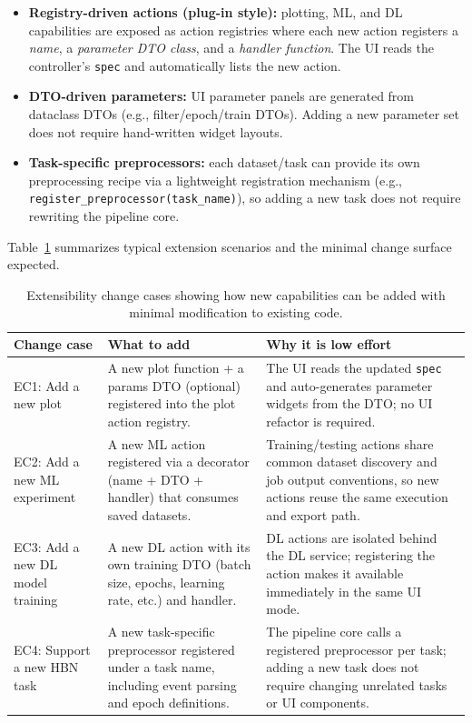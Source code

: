 \begin{itemize}[leftmargin=*]
    \item \textbf{Registry-driven actions (plug-in style):} plotting, ML, and DL capabilities are exposed as action registries where each new action registers a \textit{name}, a \textit{parameter DTO class}, and a \textit{handler function}. The UI reads the controller’s \texttt{spec} and automatically lists the new action.
    \item \textbf{DTO-driven parameters:} UI parameter panels are generated from dataclass DTOs (e.g., filter/epoch/train DTOs). Adding a new parameter set does not require hand-written widget layouts.
    \item \textbf{Task-specific preprocessors:} each dataset/task can provide its own preprocessing recipe via a lightweight registration mechanism (e.g., \texttt{register\_preprocessor(task\_name)}), so adding a new task does not require rewriting the pipeline core.
\end{itemize}

Table~\ref{tab:ext-change-cases} summarizes typical extension scenarios and the minimal change surface expected.

\begin{table}[H]
\centering
\small
\renewcommand{\arraystretch}{1.2}
\begin{tabularx}{\textwidth}{|p{}|X|X|}
\hline
\textbf{Change case} & \textbf{What to add} & \textbf{Why it is low effort} \\
\hline
EC1: Add a new plot & A new plot function + a params DTO (optional) registered into the plot action registry. & The UI reads the updated \texttt{spec} and auto-generates parameter widgets from the DTO; no UI refactor is required. \\
\hline
EC2: Add a new ML experiment & A new ML action registered via a decorator (name + DTO + handler) that consumes saved datasets. & Training/testing actions share common dataset discovery and job output conventions, so new actions reuse the same execution and export path. \\
\hline
EC3: Add a new DL model training & A new DL action with its own training DTO (batch size, epochs, learning rate, etc.) and handler. & DL actions are isolated behind the DL service; registering the action makes it available immediately in the same UI mode. \\
\hline
EC4: Support a new HBN task & A new task-specific preprocessor registered under a task name, including event parsing and epoch definitions. & The pipeline core calls a registered preprocessor per task; adding a new task does not require changing unrelated tasks or UI components. \\
\hline
\end{tabularx}
\caption{Extensibility change cases showing how new capabilities can be added with minimal modification to existing code.}
\label{tab:ext-change-cases}
\end{table}

